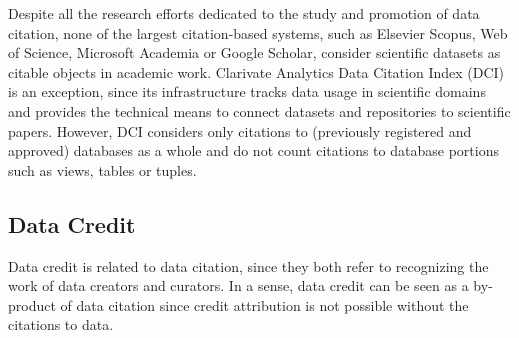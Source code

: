 Despite all the research efforts dedicated to the study and promotion of data citation, none of the largest citation-based systems, such as Elsevier Scopus, Web of Science, Microsoft Academia or Google Scholar, consider scientific datasets as citable objects in academic work. 
Clarivate Analytics Data Citation Index (DCI) \citep{force2016research} is an exception, since its infrastructure tracks data usage in scientific domains and provides the technical means to connect datasets and repositories to scientific papers. However, DCI considers only citations to (previously registered and approved) databases as a whole and do not count citations to database portions such as views, tables or tuples.

%



\subsection{Data Credit}
Data credit is related to data citation, since they both refer to recognizing the work of data creators and curators. 
In a sense, data credit can be seen as a by-product of data citation since credit attribution is not possible without the citations to data.

